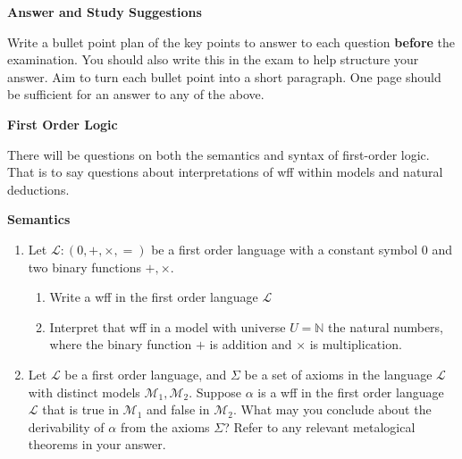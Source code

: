 \documentclass[11pt]{report}
\begin{document}
{\bf Answer and Study Suggestions}

Write a bullet point plan of the key points to answer to each question {\bf before} the examination. You should also write this in the exam to help structure your answer. Aim to turn each bullet point into a short paragraph. One page should be sufficient for an answer to any of the above.


\newpage
{\bf First Order Logic}

There will be questions on both the semantics and syntax of first-order logic. That is to say questions about interpretations of wff within models and natural deductions. 

\vspace{0.5cm}

{\bf Semantics}

\begin{enumerate}
	\item Let $\mathcal{L}:(0,+,\times,=)$ be a first order language with a constant symbol $0$ and two binary functions $+, \times$. 
	
		\begin{enumerate}
			\item Write a wff in the first order language $\mathcal{L}$
			\item Interpret that wff in a model with universe $U = \mathbb{N}$ the natural numbers, where the binary function $+$ is addition and $\times$ is multiplication.
		\end{enumerate}

	\item Let $\mathcal{L}$ be a first order language, and $\Sigma$ be a set of axioms in the language $\mathcal{L}$ with distinct models $\mathcal{M}_{1}, \mathcal{M}_{2}$. Suppose $\alpha$ is a wff in the first order language $\mathcal{L}$ that is true in $\mathcal{M}_{1}$ and false in $\mathcal{M}_{2}$. What may you conclude about the derivability of $\alpha$ from the axioms $\Sigma$? Refer to any relevant metalogical theorems in your answer. 

\end{enumerate}


\vspace{0.5cm}
\end{document}
